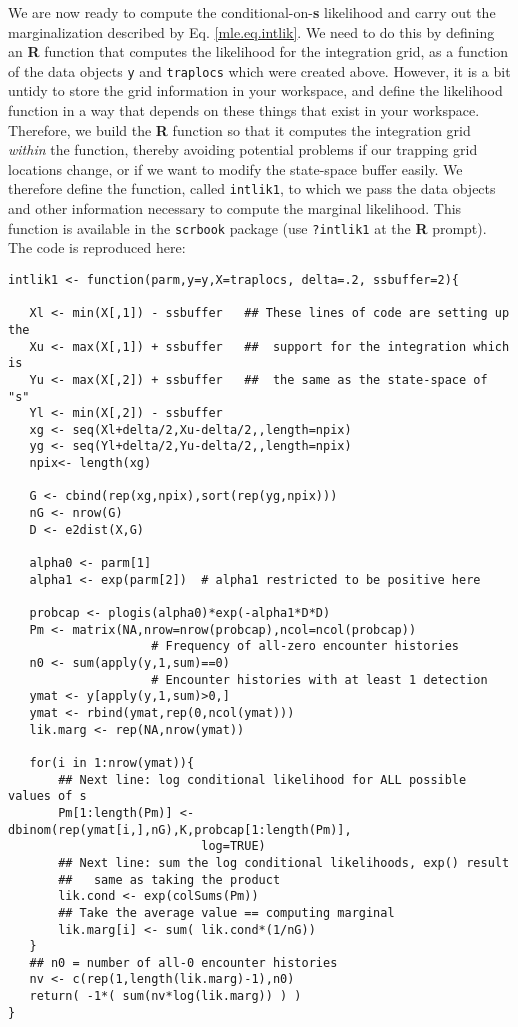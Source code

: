 We are now ready to  compute the conditional-on-{\bf s} likelihood and
carry out the marginalization described by Eq. \ref{mle.eq.intlik}.
We need to do this by defining an {\bf R} function that computes the
likelihood for the integration grid, as a function of the data objects \mbox{\tt y} and
\mbox{\tt traplocs} which were created above. However,
it is a bit untidy to store the grid information in your workspace,
and define the likelihood function in a way that depends on these things that
exist in your workspace.  Therefore, we build the {\bf R} function so
that it computes the integration grid {\it within} the function, thereby
avoiding potential problems if our trapping grid locations change, or
if we want to modify the state-space buffer easily.  We therefore
define the function, called \mbox{\tt intlik1}, to which we pass the data
objects and other information necessary to compute the marginal
likelihood.  This function is available in the \mbox{\tt scrbook}
package (use {\tt ?intlik1} at the {\bf R} prompt).  The code is
reproduced here:

{\small 
\begin{verbatim}
intlik1 <- function(parm,y=y,X=traplocs, delta=.2, ssbuffer=2){

   Xl <- min(X[,1]) - ssbuffer   ## These lines of code are setting up the 
   Xu <- max(X[,1]) + ssbuffer   ##  support for the integration which is
   Yu <- max(X[,2]) + ssbuffer   ##  the same as the state-space of "s"
   Yl <- min(X[,2]) - ssbuffer
   xg <- seq(Xl+delta/2,Xu-delta/2,,length=npix) 
   yg <- seq(Yl+delta/2,Yu-delta/2,,length=npix) 
   npix<- length(xg)

   G <- cbind(rep(xg,npix),sort(rep(yg,npix)))
   nG <- nrow(G)
   D <- e2dist(X,G)  

   alpha0 <- parm[1]
   alpha1 <- exp(parm[2])  # alpha1 restricted to be positive here
                      
   probcap <- plogis(alpha0)*exp(-alpha1*D*D)
   Pm <- matrix(NA,nrow=nrow(probcap),ncol=ncol(probcap))
                    # Frequency of all-zero encounter histories
   n0 <- sum(apply(y,1,sum)==0) 
                    # Encounter histories with at least 1 detection
   ymat <- y[apply(y,1,sum)>0,] 
   ymat <- rbind(ymat,rep(0,ncol(ymat)))
   lik.marg <- rep(NA,nrow(ymat))
   
   for(i in 1:nrow(ymat)){
       ## Next line: log conditional likelihood for ALL possible values of s
       Pm[1:length(Pm)] <- dbinom(rep(ymat[i,],nG),K,probcap[1:length(Pm)],
                           log=TRUE)
       ## Next line: sum the log conditional likelihoods, exp() result
       ##   same as taking the product
       lik.cond <- exp(colSums(Pm))
       ## Take the average value == computing marginal
       lik.marg[i] <- sum( lik.cond*(1/nG))  
   }
   ## n0 = number of all-0 encounter histories
   nv <- c(rep(1,length(lik.marg)-1),n0)
   return( -1*( sum(nv*log(lik.marg)) ) )
}
\end{verbatim}
}


